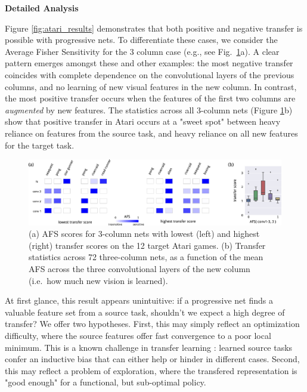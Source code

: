 
\textbf{Detailed Analysis}

Figure \ref{fig:atari_results} demonstrates that both positive and
negative transfer is possible with progressive nets. To differentiate
these cases, we consider the Average Fisher Sensitivity for the 3 column
case (e.g., see Fig.~\ref{fig:atari3_results_neil}a). A clear pattern
emerges amongst these and other examples: the most negative transfer
coincides with complete dependence on the convolutional layers of the
previous columns, and no learning of new visual features in the new
column. In contrast, the most positive transfer occurs when the
features of the first two columns are \textit{augmented} by
new features. The statistics across all 3-column nets
(Figure \ref{fig:atari3_results_neil}b) show that positive transfer in
Atari occurs at a "sweet spot" between heavy reliance on features from
the source task, and heavy reliance on all new features for the
target task.

\begin{figure}[h]
  \centering \includegraphics[width=.95\textwidth]{figures/atari3_results_neil.pdf} \caption{(a)
    AFS scores for 3-column nets with lowest (left) and highest
    (right) transfer scores on the 12 target Atari games. (b) Transfer
    statistics across 72 three-column nets, as a function of the
    mean AFS across the three convolutional layers of the new
    column (i.e.\ how much new vision is learned). } \label{fig:atari3_results_neil}
\end{figure}

At first glance, this result appears unintuitive: if a progressive net
finds a valuable feature set from a source task,
shouldn't we expect a high degree of transfer?
We offer two hypotheses. First, this may
simply reflect an optimization difficulty, where the source features offer
fast convergence to a poor local minimum. This is a known
challenge in transfer learning \cite{AAAIMag11-Taylor}: learned source
tasks confer an inductive bias that can either help or hinder in different cases.
Second, this may reflect a problem of
exploration, where the transfered representation is "good enough" for
a functional, but sub-optimal policy. 





